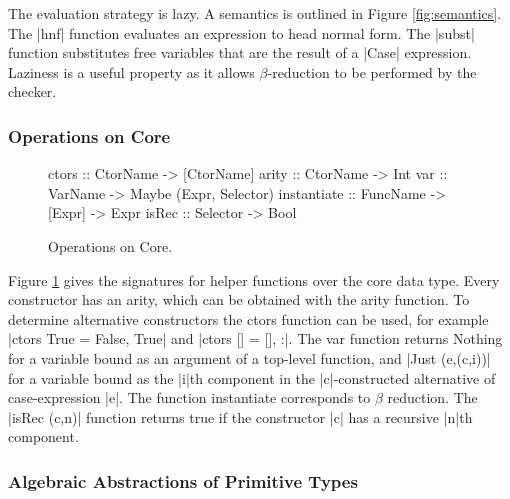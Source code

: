 \documentclass[preprint]{sigplanconf}
\newcommand{\C}[1]{\textsf{#1}}
\begin{document}
The evaluation strategy is lazy. A semantics is outlined in Figure \ref{fig:semantics}. The |hnf| function evaluates an expression to head normal form. The |subst| function substitutes free variables that are the result of a |Case| expression. Laziness is a useful property as it allows $\beta$-reduction to be performed by the checker.

\subsubsection{Operations on Core}

\begin{figure}
\begin{code}
ctors        :: CtorName  -> [CtorName]
arity        :: CtorName  -> Int
var          :: VarName   -> Maybe (Expr, Selector)
instantiate  :: FuncName  -> [Expr] -> Expr
isRec        :: Selector  -> Bool
\end{code}
\caption{Operations on Core.}
\label{fig:core_operations}
\end{figure}

Figure \ref{fig:core_operations} gives the signatures for helper functions over the core data type. Every constructor has an arity, which can be obtained with the \C{arity} function. To determine alternative constructors the \C{ctors} function can be used, for example |ctors True = {False, True}| and |ctors [] = {[], :}|. The \C{var} function returns \C{Nothing} for a variable bound as an argument of a top-level function, and |Just (e,(c,i))| for a variable bound as the |i|th component in the |c|-constructed alternative of case-expression |e|. The function \C{instantiate} corresponds to $\beta$ reduction. The |isRec (c,n)| function returns true if the constructor |c| has a recursive |n|th component.

\subsubsection{Algebraic Abstractions of Primitive Types}
\label{sec:abstraction}

\begin{comment}
Natural numbers are often encoded by Peano numerals, and this idea can easily be extended to integers:

\begin{code}
data Pos  = One | Succ Pos
data Int  = Minus Pos | Zero | Plus Pos
\end{code}

Although this abstraction of \C{Int} captures all the underlying detail of the number system, the underlying constraint systems discussed in \S\ref{sec:constraint} would be unable to distinguishing between any pair of numbers both greater than 2, or both less than -2.
\end{comment}
\end{document}
